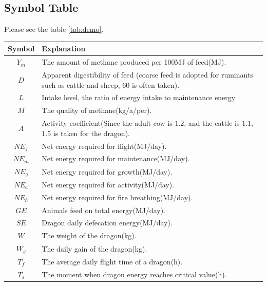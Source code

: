 \subsection{Symbol Table}
Please see the table \ref{tab:demo}.
\begin{table}[t]
    \centering
    \begin{tabularx}{\textwidth}{cX}
    \toprule
                          Symbol   & Explanation \\
    \midrule
    \rowcolor[HTML]{EFEFEF} $Y_m$  & The amount of methane produced per 100MJ of feed(MJ). \\
                            $D$    & Apparent digestibility of feed (coarse feed is adopted for ruminants such as cattle and sheep, 60 is often taken). \\
    \rowcolor[HTML]{EFEFEF} $L$    & Intake level, the ratio of energy intake to maintenance energy \\
                            $M$    & The quality of methane(kg/a/per). \\
    \rowcolor[HTML]{EFEFEF} $A$    & Activity coefficient(Since the adult cow is $1.2$, and the cattle is $1.1$, 1.5 is taken for the dragon). \\
                            $NE_f$ & Net energy required for flight(MJ/day). \\
    \rowcolor[HTML]{EFEFEF} $NE_m$ & Net energy required for maintenance(MJ/day). \\
                            $NE_g$ & Net energy required for growth(MJ/day). \\
    \rowcolor[HTML]{EFEFEF} $NE_a$ & Net energy required for activity(MJ/day). \\
                             $NE_h$ & Net energy required for fire breathing(MJ/day). \\
    \rowcolor[HTML]{EFEFEF} $GE$    & Animals feed on total energy(MJ/day). \\
                            $SE$    & Dragon daily defecation energy(MJ/day). \\
    \rowcolor[HTML]{EFEFEF} $W$     & The weight of the dragon(kg). \\
                            $W_g$   & The daily gain of the dragon(kg). \\
    \rowcolor[HTML]{EFEFEF} $T_f$   & The average daily flight time of a dragon(h). \\
                            $T_s$   & The moment when dragon energy reaches critical value(h). \\

\end{tabularx}
\end{table}
